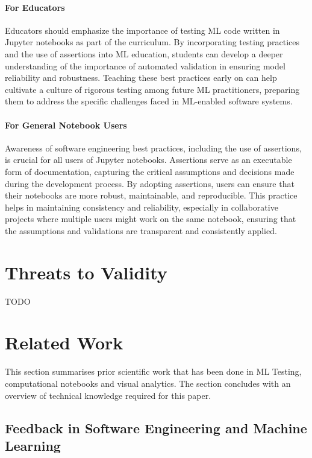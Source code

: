 \paragraph{\textbf{For Educators}} Educators should emphasize the importance of testing ML code written in Jupyter notebooks as part of the curriculum. By incorporating testing practices and the use of assertions into ML education, students can develop a deeper understanding of the importance of automated validation in ensuring model reliability and robustness. Teaching these best practices early on can help cultivate a culture of rigorous testing among future ML practitioners, preparing them to address the specific challenges faced in ML-enabled software systems.

\paragraph{\textbf{For General Notebook Users}} Awareness of software engineering best practices, including the use of assertions, is crucial for all users of Jupyter notebooks. Assertions serve as an executable form of documentation, capturing the critical assumptions and decisions made during the development process. By adopting assertions, users can ensure that their notebooks are more robust, maintainable, and reproducible. This practice helps in maintaining consistency and reliability, especially in collaborative projects where multiple users might work on the same notebook, ensuring that the assumptions and validations are transparent and consistently applied.

\section{Threats to Validity}\label{sec:threats}
TODO

\section{Related Work}\label{sec:related}

This section summarises prior scientific work that has been done in ML
Testing, computational notebooks and visual analytics. The section
concludes with an overview of technical knowledge required for this
paper.

\subsection{Feedback in Software Engineering and Machine Learning}

